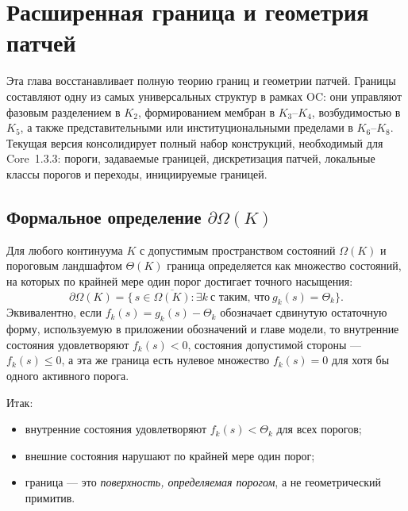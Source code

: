 
\section{Расширенная граница и геометрия патчей}
\label{sec:boundary-extended}

Эта глава восстанавливает полную теорию границ и геометрии патчей.
Границы составляют одну из самых универсальных структур в рамках OC:
они управляют фазовым разделением в \(K_2\), формированием мембран в \(K_3\)--\(K_4\),
возбудимостью в \(K_5\), а также представительными или институциональными пределами в
\(K_6\)--\(K_8\).  
Текущая версия консолидирует полный набор конструкций, необходимый для Core~1.3.3:
пороги, задаваемые границей, дискретизация патчей, локальные классы порогов
и переходы, инициируемые границей.

\subsection{Формальное определение \texorpdfstring{$\partial\Omega(K)$}{границы}}

Для любого континуума \(K\) с допустимым пространством состояний \(\Omega(K)\) и
пороговым ландшафтом \(\Theta(K)\) граница определяется как множество состояний, на которых
по крайней мере один порог достигает точного насыщения:
\[
  \partial\Omega(K)
  =
  \big\{\, s \in \overline{\Omega(K)} :
          \exists k\ \text{с таким, что}\ g_k(s) = \Theta_k \big\}.
\]
Эквивалентно, если \(f_k(s)=g_k(s)-\Theta_k\) обозначает сдвинутую остаточную форму,
используемую в приложении обозначений и главе модели, то внутренние состояния
удовлетворяют \(f_k(s)<0\), состояния допустимой стороны — \(f_k(s)\le0\),
а эта же граница есть нулевое множество \(f_k(s)=0\) для хотя бы одного
активного порога.

Итак:
\begin{itemize}
    \item внутренние состояния удовлетворяют \(f_k(s) < \Theta_k\) для всех порогов;
    \item внешние состояния нарушают по крайней мере один порог;
    \item граница — это \emph{поверхность, определяемая порогом}, а не геометрический
          примитив.
\end{itemize}

